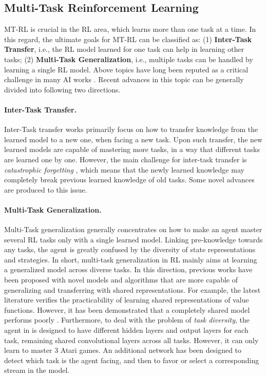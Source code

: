 \documentclass[letterpaper]{article} %
\begin{document}
\subsection{Multi-Task Reinforcement Learning}
MT-RL is crucial in the RL area, which learns more than one task at a time. In this regard, the ultimate goals for MT-RL can be classified as:
(1) \textbf{Inter-Task Transfer}, i.e., the RL model learned for one task can help in learning other tasks;
(2) \textbf{Multi-Task Generalization}, i.e.,  multiple tasks can be handled by learning a single RL model.
Above topics have long been reputed as a critical challenge in many AI works \cite{ring1994continual,silver2013lifelong,taylor2011introduction}. Recent advances in this topic can be generally divided into following two directions.

\paragraph{Inter-Task Transfer.}
Inter-Task transfer works primarily focus on how to transfer knowledge from the learned model to a new one, when facing a new task.
Upon such transfer, the new learned models are capable of mastering more tasks, in a way that different tasks are learned one by one.
However, the main challenge for inter-task transfer is \textit{catastrophic forgetting} \cite{mccloskey1989catastrophic,mcclelland1995there,ratcliff1990connectionist}, which means that the newly learned knowledge may completely break previous learned knowledge of old tasks. Some novel advances \cite{rusu2016progressive,fahlman1990cascade,kirkpatrick2017overcoming,rusu2015policy,terekhov2015knowledge,parisotto16_actormimic} are produced to this issue.

\paragraph{Multi-Task Generalization.} Multi-Task generalization \cite{borsa2016learning,romoff2016deep,sermanet2016unsupervised} generally concentrates on how to make an agent master several RL tasks only with a single learned model. Linking pre-knowledge towards any tasks, the agent is greatly confused by the diversity of state representations and strategies. In short, multi-task generalization in RL mainly aims at learning a generalized model across diverse tasks. In this direction, previous works have been proposed with novel models and algorithms that are more capable of generalizing and transferring with shared representations. For example, the latest literature \cite{borsa2016learning} verifies the practicability of learning shared representations of value functions. However, it has been demonstrated that a completely shared model performs poorly \cite{romoff2016deep}. Furthermore, to deal with the problem of \textit{task diversity}, the agent in \cite{romoff2016deep} is designed to have different hidden layers and output layers for each task, remaining shared convolutional layers across all tasks. However, it can only learn to master 3 Atari games. An additional network \cite{sermanet2016unsupervised} has been designed to detect which task is the agent facing, and then to favor or select a corresponding stream in the model.
\end{document}
